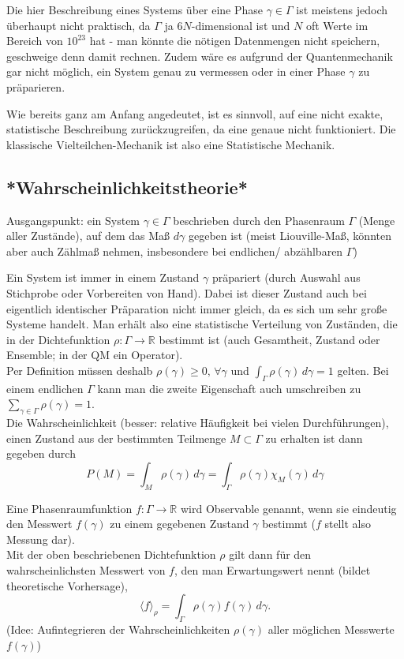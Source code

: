 Die hier Beschreibung eines Systems über eine Phase $\gamma \in \Gamma$ ist meistens jedoch überhaupt nicht praktisch, da $\Gamma$ ja $6N$-dimensional ist und $N$ oft Werte im Bereich von $10^{23}$ hat - man könnte die nötigen Datenmengen nicht speichern, geschweige denn damit rechnen. Zudem wäre es aufgrund der Quantenmechanik gar nicht möglich, ein System genau zu vermessen oder in einer Phase $\gamma$ zu präparieren.

Wie bereits ganz am Anfang angedeutet, ist es sinnvoll, auf eine nicht exakte, statistische Beschreibung zurückzugreifen, da eine genaue nicht funktioniert. Die klassische Vielteilchen-Mechanik ist also eine Statistische Mechanik.



	\subsection{*Wahrscheinlichkeitstheorie*}
Ausgangspunkt: ein System $\gamma \in \Gamma$ beschrieben durch den Phasenraum $\Gamma$ (Menge aller Zustände), auf dem das Maß $d\gamma$ gegeben ist (meist Liouville-Maß, könnten aber auch Zählmaß nehmen, insbesondere bei endlichen/ abzählbaren $\Gamma$)

Ein System ist immer in einem Zustand $\gamma$ präpariert (durch Auswahl aus Stichprobe oder Vorbereiten von Hand). Dabei ist dieser Zustand auch bei eigentlich identischer Präparation nicht immer gleich, da es sich um sehr große Systeme handelt. Man erhält also eine statistische Verteilung von Zuständen, die in der Dichtefunktion $\rho: \Gamma \rightarrow \mathbb{R}$ bestimmt ist (auch Gesamtheit, Zustand oder Ensemble; in der QM ein Operator).\\
Per Definition müssen deshalb $\rho(\gamma) \geq 0, \, \forall \gamma$ und $\int_\Gamma \rho(\gamma) \, d\gamma = 1$ gelten. Bei einem endlichen $\Gamma$ kann man die zweite Eigenschaft auch umschreiben zu $\sum\limits_{\gamma \in \Gamma} \rho(\gamma) = 1$.\\
Die Wahrscheinlichkeit (besser: relative Häufigkeit bei vielen Durchführungen), einen Zustand aus der bestimmten Teilmenge $M \subset \Gamma$ zu erhalten ist dann gegeben durch
\begin{equation}\label{key}
P(M) = \int_M \rho(\gamma) \, d\gamma = \int_\Gamma \rho(\gamma)\chi_M(\gamma) \, d\gamma
\end{equation}

Eine Phasenraumfunktion $f: \Gamma \rightarrow \mathbb{R}$ wird Observable genannt, wenn sie eindeutig den Messwert $f(\gamma)$ zu einem gegebenen Zustand $\gamma$ bestimmt ($f$ stellt also Messung dar).\\
Mit der oben beschriebenen Dichtefunktion $\rho$ gilt dann für den wahrscheinlichsten Messwert von $f$, den man Erwartungswert nennt (bildet theoretische Vorhersage),
\begin{equation}\label{key}
\langle f \rangle_\rho = \int_\Gamma \rho(\gamma) f(\gamma) \, d\gamma .
\end{equation}
(Idee: Aufintegrieren der Wahrscheinlichkeiten $\rho(\gamma)$ aller möglichen Messwerte $f(\gamma)$)

